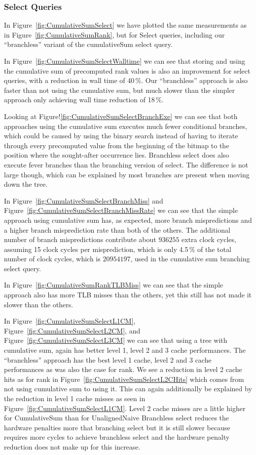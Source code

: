 \subsubsection{Select Queries}
\label{sec:cumulativeSumExperimentSelectQueries}
In Figure~\ref{fig:CumulativeSumSelect} we have plotted the same measurements as in Figure~\ref{fig:CumulativeSumRank}, but for Select queries, including our “branchless” variant of the cumulativeSum select query.

In Figure~\ref{fig:CumulativeSumSelectWalltime} we can see that storing and using the cumulative sum of precomputed rank values is also an improvement for select queries, with a reduction in wall time of 40\,\%.
Our “branchless” approach is also faster than not using the cumulative sum, but much slower than the simpler approach only achieving wall time reduction of 18\,\%.

Looking at Figure!\ref{fig:CumulativeSumSelectBranchExe} we can see that both approaches using the cumulative sum executes much fewer conditional branches, which could be caused by using the binary search instead of having to iterate through every precomputed value from the beginning of the bitmap to the position where the sought-after occurrence lies.
Branchless select does also execute fever branches than the branching version of select.
The difference is not large though, which can be explained by most branches are present when moving down the tree.


In Figure~\ref{fig:CumulativeSumSelectBranchMiss} and Figure~\ref{fig:CumulativeSumSelectBranchMissRate} we can see that the simple approach using cumulative sum has, as expected, more branch mispredictions and a higher branch misprediction rate than both of the others.
The additional number of branch mispredictions contribute about $\num{936255}$ extra clock cycles, assuming 15 clock cycles per misprediction, which is only 4.5\,\% of the total number of clock cycles, which is $\num{20954197}$, used in the cumulative sum branching select query.

In Figure~\ref{fig:CumulativeSumRankTLBMiss} we can see that the simple approach also has more TLB misses than the others, yet this still has not made it slower than the others.

In Figure~\ref{fig:CumulativeSumSelectL1CM}, Figure~\ref{fig:CumulativeSumSelectL2CM}, and Figure~\ref{fig:CumulativeSumSelectL3CM} we can see that using a tree with cumulative sum, again has better level 1, level 2 and 3 cache performances.
The “branchless” approach has the best level 1 cache, level 2 and 3 cache performances as was also the case for rank.
We see a reduction in level 2 cache hits as for rank in Figure~\ref{fig:CumulativeSumSelectL2CHits} which comes from not using cumulative sum to using it. 
This can again additionally be explained by the reduction in level 1 cache misses as seen in Figure~\ref{fig:CumulativeSumSelectL1CM}.
Level 2 cache misses are a little higher for CumulativeSum than for UnalignedNaive
Branchless select reduces the hardware penalties more that branching select but it is still slower because requires more cycles to achieve branchless select and the hardware penalty reduction does not make up for this increase.

